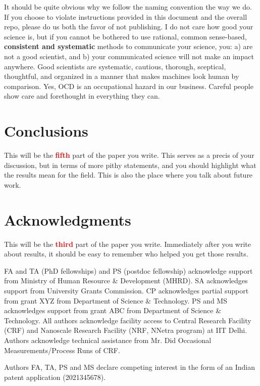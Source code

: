 \documentclass[12 pt]{article}
\begin{document}
It should be quite obvious why we follow the naming convention the way we do. If you choose to violate instructions provided in this document and the overall repo, please do us both the favor of not publishing. I do not care how good your science is, but if you cannot be bothered to use rational, common sense-based, \textbf{consistent and systematic} methods to communicate your science, you: a) are not a good scientist, and b) your communicated science will not make an impact anywhere. Good scientists are systematic, cautious, thorough, sceptical, thoughtful, and organized in a manner that makes machines look human by comparison. Yes, OCD is an occupational hazard in our business. Careful people show care and forethought in everything they can.

\section{Conclusions}
\label{sec:conclusions}

This will be the \textbf{\Huge \textcolor{red}{fifth}} part of the paper you write. This serves as a precis of your discussion, but in terms of more pithy statements, and you should highlight what the results mean for the field. This is also the place where you talk about future work.

\section*{Acknowledgments}

This will be the \textbf{\Huge \textcolor{red}{third}} part of the paper you write. Immediately after you write about results, it should be easy to remember who helped you get those results.

FA and TA (PhD fellowships) and PS (postdoc fellowship) acknowledge support from Ministry of Human Resource \& Development (MHRD). SA acknowledges support from University Grants Commission. CP acknowledges partial support from grant XYZ from Department of Science \& Technology. PS and MS acknowledges support from grant ABC from Department of Science \& Technology. All authors acknowledge facility access to Central Research Facility (CRF) and Nanoscale Research Facility (NRF, NNetra program) at IIT Delhi. Authors acknowledge technical assistance from Mr. Did Occasional Measurements/Process Runs of CRF.

Authors FA, TA, PS and MS declare competing interest in the form of an Indian patent application (2021345678).

\printbibliography
\end{document}
